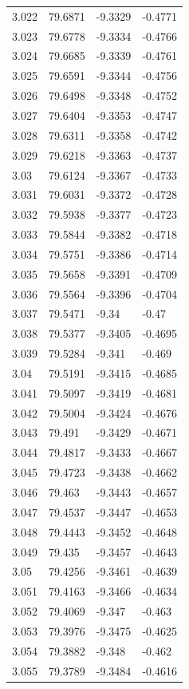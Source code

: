 \begin{tabular}{llll}
3.022 & 79.6871 & -9.3329 & -0.4771 \\
3.023 & 79.6778 & -9.3334 & -0.4766 \\
3.024 & 79.6685 & -9.3339 & -0.4761 \\
3.025 & 79.6591 & -9.3344 & -0.4756 \\
3.026 & 79.6498 & -9.3348 & -0.4752 \\
3.027 & 79.6404 & -9.3353 & -0.4747 \\
3.028 & 79.6311 & -9.3358 & -0.4742 \\
3.029 & 79.6218 & -9.3363 & -0.4737 \\
3.03 & 79.6124 & -9.3367 & -0.4733 \\
3.031 & 79.6031 & -9.3372 & -0.4728 \\
3.032 & 79.5938 & -9.3377 & -0.4723 \\
3.033 & 79.5844 & -9.3382 & -0.4718 \\
3.034 & 79.5751 & -9.3386 & -0.4714 \\
3.035 & 79.5658 & -9.3391 & -0.4709 \\
3.036 & 79.5564 & -9.3396 & -0.4704 \\
3.037 & 79.5471 & -9.34 & -0.47 \\
3.038 & 79.5377 & -9.3405 & -0.4695 \\
3.039 & 79.5284 & -9.341 & -0.469 \\
3.04 & 79.5191 & -9.3415 & -0.4685 \\
3.041 & 79.5097 & -9.3419 & -0.4681 \\
3.042 & 79.5004 & -9.3424 & -0.4676 \\
3.043 & 79.491 & -9.3429 & -0.4671 \\
3.044 & 79.4817 & -9.3433 & -0.4667 \\
3.045 & 79.4723 & -9.3438 & -0.4662 \\
3.046 & 79.463 & -9.3443 & -0.4657 \\
3.047 & 79.4537 & -9.3447 & -0.4653 \\
3.048 & 79.4443 & -9.3452 & -0.4648 \\
3.049 & 79.435 & -9.3457 & -0.4643 \\
3.05 & 79.4256 & -9.3461 & -0.4639 \\
3.051 & 79.4163 & -9.3466 & -0.4634 \\
3.052 & 79.4069 & -9.347 & -0.463 \\
3.053 & 79.3976 & -9.3475 & -0.4625 \\
3.054 & 79.3882 & -9.348 & -0.462 \\
3.055 & 79.3789 & -9.3484 & -0.4616 \\

\end{tabular}
